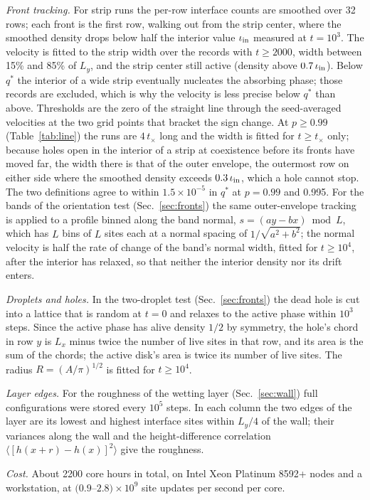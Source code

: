\documentclass[pre,twocolumn,superscriptaddress,showpacs,floatfix]{revtex4-2}
\newcommand{\qs}{q^{*}}
\begin{document}
\textit{Front tracking.} For strip runs the per-row interface counts are smoothed over 32 rows;
each front is the first row, walking out from the strip center, where the smoothed density drops
below half the interior value $\iota_{\rm in}$ measured at $t = 10^3$. The velocity is fitted to
the strip width over the records with $t\ge 2000$, width between 15\% and 85\% of $L_y$, and the
strip center still active (density above $0.7\,\iota_{\rm in}$). Below $\qs$ the interior of a wide
strip eventually nucleates the absorbing phase; those records are excluded, which is why the
velocity is less precise below $\qs$ than above. Thresholds are the zero of the straight line
through the seed-averaged velocities at the two grid points that bracket the sign change. At
$p\ge 0.99$ (Table~\ref{tab:line}) the runs are $4\,t_\times$ long and the width is fitted for
$t\ge t_\times$ only; because holes open in the interior of a strip at coexistence before its
fronts have moved far, the width there is that of the outer envelope, the outermost row on either
side where the smoothed density exceeds $0.3\,\iota_{\rm in}$, which a hole cannot stop. The two
definitions agree to within $1.5\times10^{-5}$ in $\qs$ at $p = 0.99$ and 0.995. For the bands of
the orientation test (Sec.~\ref{sec:fronts}) the same outer-envelope tracking is applied to a
profile binned along the band normal, $s = (ay - bx)\bmod L$, which has $L$ bins of $L$ sites each
at a normal spacing of $1/\sqrt{a^2+b^2}$; the normal velocity is half the rate of change of the
band's normal width, fitted for $t\ge 10^4$, after the interior has relaxed, so that neither the
interior density nor its drift enters.

\textit{Droplets and holes.} In the two-droplet test (Sec.~\ref{sec:fronts}) the dead hole is cut
into a lattice that is random at $t = 0$ and relaxes to the active phase within $10^3$ steps. Since
the active phase has alive density $1/2$ by symmetry, the hole's chord in row $y$ is $L_x$ minus
twice the number of live sites in that row, and its area is the sum of the chords; the active
disk's area is twice its number of live sites. The radius $R = (A/\pi)^{1/2}$ is fitted for
$t\ge 10^4$.

\textit{Layer edges.} For the roughness of the wetting layer (Sec.~\ref{sec:wall}) full
configurations were stored every $10^5$ steps. In each column the two edges of the layer are its
lowest and highest interface sites within $L_y/4$ of the wall; their variances along the wall and
the height-difference correlation $\langle[h(x+r)-h(x)]^2\rangle$ give the roughness.

\textit{Cost.} About 2200 core hours in total, on Intel Xeon Platinum 8592+ nodes and a workstation,
at $(0.9$--$2.8)\times10^9$ site updates per second per core.


\end{document}
